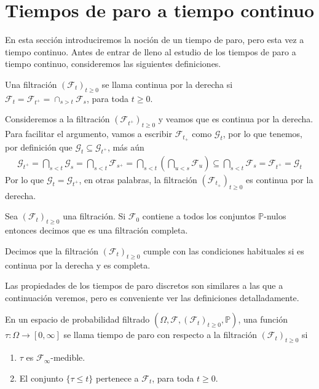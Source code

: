 \section{Tiempos de paro a tiempo continuo}
En esta sección introduciremos la noción de un tiempo de paro, pero esta vez a tiempo continuo. Antes de entrar de lleno al estudio de los tiempos de paro a tiempo continuo, consideremos las siguientes definiciones.
\begin{definition}
	Una filtración $(\mathcal{F}_t)_{t \geq 0}$ se llama continua por la derecha si $\mathcal{F}_t = \mathcal{F}_{t^{+}} = \cap_{s > t} \mathcal{F}_s$, para toda $t \geq 0$.
\end{definition}

Consideremos a la filtración $(\mathcal{F}_{t^{+}})_{t \geq 0}$ y veamos que es continua por la derecha. Para facilitar el argumento, vamos a escribir $\mathcal{F}_{t_{+}}$ como $\mathcal{G}_t$, por lo que tenemos, por definición que $\mathcal{G}_t \subseteq \mathcal{G}_{t^{+}}$, más aún
	\begin{align*}
	\mathcal{G}_{t^{+}} = \bigcap_{s < t} \mathcal{G}_s = \bigcap_{s < t} \mathcal{F}_{s^{+}} = \bigcap_{s < t}  \left( \bigcap_{u < s} \mathcal{F}_u \right) \subseteq \bigcap_{s < t} \mathcal{F}_s = \mathcal{F}_{t^{+}} = \mathcal{G}_t
	\end{align*}
Por lo que $\mathcal{G}_t  = \mathcal{G}_{t^{+}}$, en otras palabras, la filtración $(\mathcal{F}_{t_{+}})_{t \geq 0}$ es continua por la derecha. \\

\begin{definition}
	Sea $(\mathcal{F}_t )_{t \geq 0}$ una filtración. Si $\mathcal{F}_0$ contiene a todos los conjuntos $\mathbb{P}$-nulos entonces decimos que es una filtración completa.
\end{definition}

\begin{definition}
	Decimos que la filtración $(\mathcal{F}_t )_{t \geq 0}$ cumple con las condiciones habituales si es continua por la derecha y es completa.
\end{definition}

Las propiedades de los tiempos de paro discretos son similares a las que a continuación veremos, pero es conveniente ver las definiciones detalladamente.

\begin{definition}
	En un espacio de probabilidad filtrado $(\Omega, \mathcal{F}, (\mathcal{F}_t)_{t \geq 0}, \mathbb{P})$, una función $\tau : \Omega \rightarrow [0, \infty]$ se llama tiempo de paro con respecto a la filtración $(\mathcal{F}_t)_{t \geq 0}$ si
	\begin{enumerate}
		\item $\tau$ es $\mathcal{F}_{\infty}$-medible.
		\item El conjunto $\{ \tau \leq t \}$ pertenece a $\mathcal{F}_t$, para toda $t \geq 0$.
	\end{enumerate}
\end{definition}

